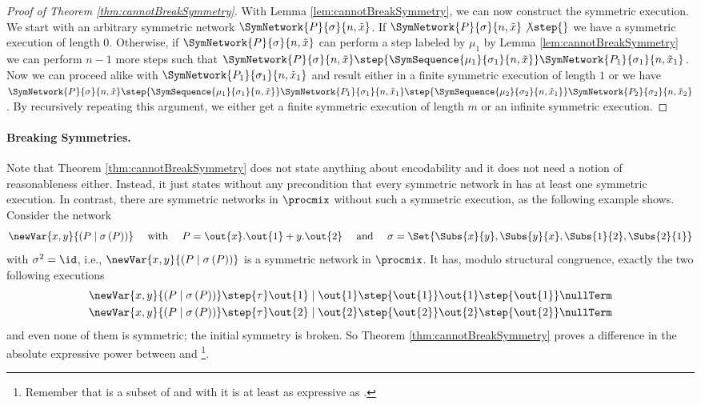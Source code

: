 \documentclass[11pt,techReport]{eptcs}
\begin{document}
\begin{proof}[Proof of Theorem \ref{thm:cannotBreakSymmetry}]
	With Lemma \ref{lem:cannotBreakSymmetry}, we can now construct the symmetric execution. We start with an arbitrary symmetric network $ \SymNetwork{P}{\sigma}{n, \tilde{x}} $. If $ \SymNetwork{P}{\sigma}{n, \tilde{x}} \not\step{} $ we have a symmetric execution of length $ 0 $. Otherwise, if $ \SymNetwork{P}{\sigma}{n, \tilde{x}} $ can perform a step labeled by $ \mu_1 $ by Lemma \ref{lem:cannotBreakSymmetry} we can perform $ n {-} 1 $ more steps such that $ \SymNetwork{P}{\sigma}{n, \tilde{x}} \step{\SymSequence{\mu_1}{\sigma_1}{n, \tilde{x}}} \SymNetwork{P_1}{\sigma_1}{n, \tilde{x}_1} $. Now we can proceed alike with $ \SymNetwork{P_1}{\sigma_1}{n, \tilde{x}_1} $ and result either in a finite symmetric execution of length $ 1 $ or we have $ \SymNetwork{P}{\sigma}{n, \tilde{x}} \step{\SymSequence{\mu_1}{\sigma_1}{n, \tilde{x}}} \SymNetwork{P_1}{\sigma_1}{n, \tilde{x}_1} \step{\SymSequence{\mu_2}{\sigma_2}{n, \tilde{x}_1}} \SymNetwork{P_2}{\sigma_2}{n, \tilde{x}_2} $. By recursively repeating this argument, we either get a finite symmetric execution of length $ m $ or an infinite symmetric execution.
\end{proof}



\paragraph{Breaking Symmetries.}
\label{sec:breaking-symmetries}



Note that Theorem \ref{thm:cannotBreakSymmetry} does not state anything about encodability and it does not need a notion of reasonableness either. Instead, it just states without any precondition that every symmetric network in \procsep has at least one symmetric execution.  In contrast, there are symmetric networks in $ \procmix $ without such a symmetric execution, as the following example shows. Consider the network
\begin{align*}
	\newVar{x, y}{\left( P \mid \sigma\left( P \right) \right)} \quad \text{ with } \quad P = \out{x}.\out{1} + y.\out{2} \quad \text{ and } \quad \sigma = \Set{ \Subs{x}{y}, \Subs{y}{x}, \Subs{1}{2}, \Subs{2}{1} }
\end{align*}
with $ \sigma^2 = \id $, i.e., $ \newVar{x, y}{\left( P \mid \sigma\left( P \right) \right)} $ is a symmetric network in $ \procmix $. It has, modulo structural congruence, exactly the two following executions 
\begin{align*}
	\newVar{x, y}{\left( P \mid \sigma\left( P \right) \right)} & \step{\tau} \out{1} \mid \out{1} \step{\out{1}} \out{1} \step{\out{1}} \nullTerm\\
	\newVar{x, y}{\left( P \mid \sigma\left( P \right) \right)} & \step{\tau} \out{2} \mid \out{2} \step{\out{2}} \out{2} \step{\out{2}} \nullTerm
\end{align*}
and even none of them is symmetric; the initial symmetry is broken.  So Theorem \ref{thm:cannotBreakSymmetry} proves a difference in the absolute expressive power between \pisep and \pimix\footnote{Remember that \pisep is a subset of \pimix and with it \pimix is at least as expressive as \pisep.}.
\end{document}
